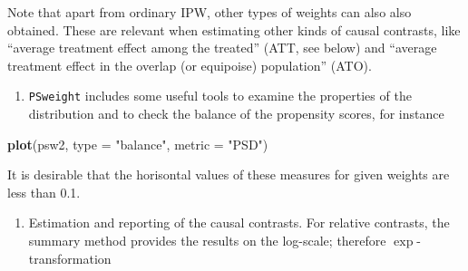\documentclass[
]{book}
\newenvironment{Shaded}{\begin{snugshade}}{\end{snugshade}}
\newcommand{\AttributeTok}[1]{\textcolor[rgb]{0.13,0.29,0.53}{#1}}
\newcommand{\DecValTok}[1]{\textcolor[rgb]{0.00,0.00,0.81}{#1}}
\newcommand{\FunctionTok}[1]{\textcolor[rgb]{0.13,0.29,0.53}{\textbf{#1}}}
\newcommand{\NormalTok}[1]{#1}
\newcommand{\OtherTok}[1]{\textcolor[rgb]{0.56,0.35,0.01}{#1}}
\newcommand{\SpecialCharTok}[1]{\textcolor[rgb]{0.81,0.36,0.00}{\textbf{#1}}}
\newcommand{\StringTok}[1]{\textcolor[rgb]{0.31,0.60,0.02}{#1}}
\providecommand{\tightlist}{%
  \setlength{\itemsep}{0pt}\setlength{\parskip}{0pt}}
\begin{document}
Note that apart from ordinary IPW, other types of
weights can also also
obtained. These are relevant when estimating other
kinds of causal
contrasts, like ``average treatment effect among the treated''
(ATT, see below) and ``average treatment effect in the overlap
(or equipoise) population'' (ATO).

\begin{enumerate}
\def\labelenumi{\arabic{enumi}.}
\setcounter{enumi}{1}
\tightlist
\item
  \texttt{PSweight} includes some useful tools to examine the
  properties of the distribution and to check the balance
  of the propensity scores, for instance
\end{enumerate}

\begin{Shaded}
\begin{Highlighting}[]
\FunctionTok{plot}\NormalTok{(psw2, }\AttributeTok{type =} \StringTok{"balance"}\NormalTok{, }\AttributeTok{metric =} \StringTok{"PSD"}\NormalTok{)}
\end{Highlighting}
\end{Shaded}

It is desirable that the horisontal values of
these measures for given weights are less than 0.1.

\begin{enumerate}
\def\labelenumi{\arabic{enumi}.}
\setcounter{enumi}{2}
\tightlist
\item
  Estimation and reporting of the causal contrasts. For relative
  contrasts, the summary method provides the results
  on the log-scale; therefore \(\exp\)-transformation
\end{enumerate}

\begin{Shaded}
\end{Shaded}
\end{document}
